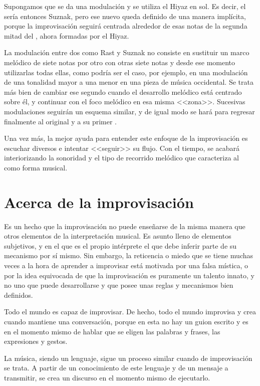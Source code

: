 Supongamos que se da una modulación y se utiliza el \yins Hiyaz en sol. Es decir, el \maqam sería entonces \maqam Suznak, pero ese nuevo \maqam queda definido de una manera implícita, porque la improvisación seguirá centrada alrededor de esas notas de la segunda mitad del \maqamb, ahora formadas por el \yins Hiyaz.

La modulación entre dos \maqamaat como Rast y Suznak no consiste en sustituir un marco melódico de siete notas por otro con otras siete notas y desde ese momento utilizarlas todas ellas, como podría ser el caso, por ejemplo, en una modulación de una tonalidad mayor a una menor en una pieza de música occidental. Se trata más bien de cambiar ese segundo \yins cuando el desarrollo melódico está centrado sobre él, y continuar con el foco melódico en esa misma <<zona>>. Sucesivas modulaciones seguirán un esquema similar, y de igual modo se hará para regresar finalmente al \maqam original y a su primer \yinsb.

Una vez más, la mejor ayuda para entender este enfoque de la improvisación es escuchar diversos \taqasim e intentar <<seguir>> su flujo. Con el tiempo, se acabará interiorizando la sonoridad y el tipo de recorrido melódico que caracteriza al \taqsim como forma musical.

\section{Acerca de la improvisación}

Es un hecho que la improvisación no puede enseñarse de la misma manera que otros elementos de la interpretación musical. Es asunto lleno de elementos subjetivos, y en el que es el propio intérprete el que debe inferir parte de su mecanismo por sí mismo. Sin embargo, la reticencia o miedo que se tiene muchas veces a la hora de aprender a improvisar está motivada por una falsa mística, o por la idea equivocada de que la improvisación es puramente un talento innato, y no uno que puede desarrollarse y que posee unas reglas y  mecanismos bien definidos.

Todo el mundo es capaz de improvisar. De hecho, todo el mundo improvisa y crea cuando mantiene una conversación, porque en esta no hay un guion escrito y es en el momento mismo de hablar que se eligen las palabras y frases, las expresiones y gestos.

La música, siendo un lenguaje, sigue un proceso similar cuando de improvisación se trata. A partir de un conocimiento de este lenguaje y de un mensaje a transmitir, se crea un discurso en el momento mismo de ejecutarlo.

